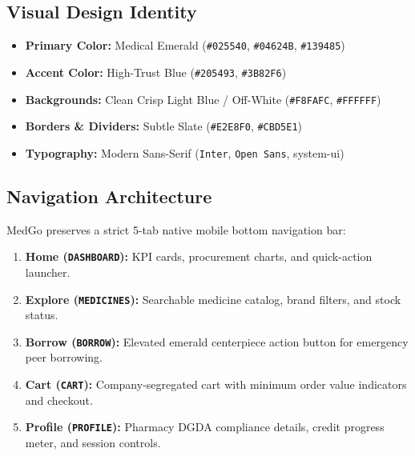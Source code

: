 \documentclass[10pt,a4paper]{article}
\begin{document}
\subsection{Visual Design Identity}
\begin{itemize}[leftmargin=*]
    \item \textbf{Primary Color:} Medical Emerald (\texttt{\#025540}, \texttt{\#04624B}, \texttt{\#139485})
    \item \textbf{Accent Color:} High-Trust Blue (\texttt{\#205493}, \texttt{\#3B82F6})
    \item \textbf{Backgrounds:} Clean Crisp Light Blue / Off-White (\texttt{\#F8FAFC}, \texttt{\#FFFFFF})
    \item \textbf{Borders \& Dividers:} Subtle Slate (\texttt{\#E2E8F0}, \texttt{\#CBD5E1})
    \item \textbf{Typography:} Modern Sans-Serif (\texttt{Inter}, \texttt{Open Sans}, system-ui)
\end{itemize}

\subsection{Navigation Architecture}
MedGo preserves a strict 5-tab native mobile bottom navigation bar:
\begin{enumerate}[leftmargin=*]
    \item \textbf{Home (\texttt{DASHBOARD}):} KPI cards, procurement charts, and quick-action launcher.
    \item \textbf{Explore (\texttt{MEDICINES}):} Searchable medicine catalog, brand filters, and stock status.
    \item \textbf{Borrow (\texttt{BORROW}):} Elevated emerald centerpiece action button for emergency peer borrowing.
    \item \textbf{Cart (\texttt{CART}):} Company-segregated cart with minimum order value indicators and checkout.
    \item \textbf{Profile (\texttt{PROFILE}):} Pharmacy DGDA compliance details, credit progress meter, and session controls.
\end{enumerate}
\end{document}
